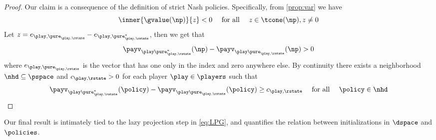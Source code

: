 \begin{proof}
Our claim  is a consequence of the definition of strict Nash policies. Specifically, from \cref{prop:var} we have
\begin{equation}
    \inner{\gvalue(\np)}{z} <0 \quad\text{ for all }\quad z\in \tcone(\np), z\neq 0
\end{equation}
Let $z = e_{\play,\pure_{\play,\rstate}} -e_{\play,\pure^*_{\play,\rstate}}$, then we get that 
\begin{equation}
    \payv_{\play\pure_{\play,\rstate}^*}\parens{\np} - \payv_{\play\pure_{\play,\rstate}}\parens{\np} >0
\end{equation}
where $e_{\play,\pure_{\play,\rstate}}$ is the vector that has one only in the index and zero anywhere else.
By continuity there exists a neighborhood $\nhd\subseteq\pspace$ and $c_{\play,\rstate} > 0$ for each player $\play\in\players$ such that 
\begin{equation*}
 \payv_{\play\pure_{\play,\rstate}^*}\parens{\policy} - \payv_{\play\pure_{\play,\rstate}}\parens{\policy} \geq c_{\play,\rstate} \quad\text{ for all }\quad\policy\in\nhd
 \qedhere
\end{equation*}
\end{proof}

Our final result is intimately tied to the lazy projection step in \eqref{eq:LPG}, and quantifies the relation between initializations in $\dspace$ and $\policies$. 

